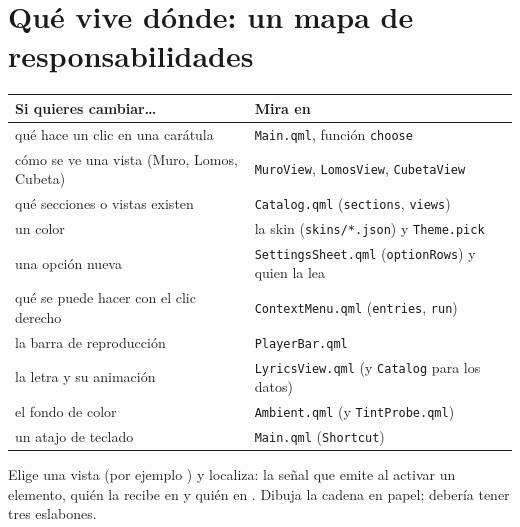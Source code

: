 \section{Qué vive dónde: un mapa de responsabilidades}

\begin{center}
\small
\begin{tabularx}{\linewidth}{@{}lX@{}}
\toprule
Si quieres cambiar\dots & Mira en \\
\midrule
qué hace un clic en una carátula & \texttt{Main.qml}, función \texttt{choose} \\
cómo se ve una vista (Muro, Lomos, Cubeta) & \texttt{MuroView}, \texttt{LomosView}, \texttt{CubetaView} \\
qué secciones o vistas existen & \texttt{Catalog.qml} (\texttt{sections}, \texttt{views}) \\
un color & la skin (\texttt{skins/*.json}) y \texttt{Theme.pick} \\
una opción nueva & \texttt{SettingsSheet.qml} (\texttt{optionRows}) y quien la lea \\
qué se puede hacer con el clic derecho & \texttt{ContextMenu.qml} (\texttt{entries}, \texttt{run}) \\
la barra de reproducción & \texttt{PlayerBar.qml} \\
la letra y su animación & \texttt{LyricsView.qml} (y \texttt{Catalog} para los datos) \\
el fondo de color & \texttt{Ambient.qml} (y \texttt{TintProbe.qml}) \\
un atajo de teclado & \texttt{Main.qml} (\texttt{Shortcut}) \\
\bottomrule
\end{tabularx}
\end{center}

\begin{ejercicio}
Elige una vista (por ejemplo ) y localiza: la señal que emite al
activar un elemento, quién la recibe en  y quién en
. Dibuja la cadena en papel; debería tener tres eslabones.
\end{ejercicio}
